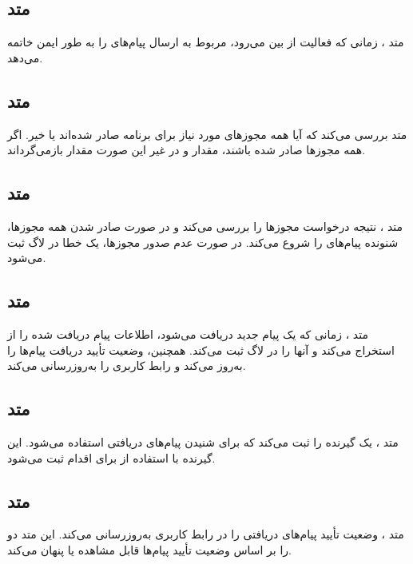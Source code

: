 \documentclass{report}
\begin{document}
\subsection{متد
	}
متد
، زمانی که فعالیت از بین می‌رود،
 مربوط به ارسال پیام‌های
   را به طور ایمن خاتمه می‌دهد.
   
\subsection{متد
	}

متد 
 بررسی می‌کند که آیا همه مجوزهای مورد نیاز برای برنامه صادر شده‌اند یا خیر. اگر همه مجوزها صادر شده باشند، مقدار 
  و در غیر این صورت مقدار 
   بازمی‌گرداند.


\subsection{متد
}
متد
، نتیجه درخواست مجوزها را بررسی می‌کند و در صورت صادر شدن همه مجوزها، شنونده پیام‌های
 را شروع می‌کند. در صورت عدم صدور مجوزها، یک خطا در لاگ ثبت می‌شود.

\subsection{متد
}
متد 
، زمانی که یک پیام جدید دریافت می‌شود، اطلاعات پیام دریافت شده را از 
 استخراج می‌کند و آنها را در لاگ ثبت می‌کند. همچنین، وضعیت تأیید دریافت پیام‌ها را به‌روز می‌کند و رابط کاربری را به‌روزرسانی می‌کند.

\subsection{متد
}
متد
، یک گیرنده
 را ثبت می‌کند که برای شنیدن پیام‌های دریافتی
   استفاده می‌شود. این گیرنده با استفاده از 
   برای اقدام
     ثبت می‌شود.

\subsection{متد
	}
متد
، وضعیت تأیید پیام‌های دریافتی را در رابط کاربری به‌روزرسانی می‌کند. این متد دو 
را بر اساس وضعیت تأیید پیام‌ها قابل مشاهده یا پنهان می‌کند.
\end{document}
